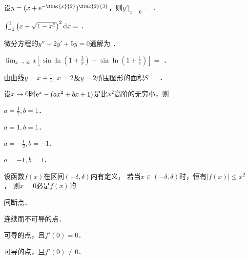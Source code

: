 \documentclass[plain,noanswer,medmath]{../../template/jnuexam}
\begin{document}




\begin{problem}
设$y = (x + \e^{-\frac{x}{2}})^{\frac{2}{3}}$，则$y'|_{x = 0} =$ \fillin{}．
\end{problem}


\begin{problem}
$\int_{-1}^1\left(x + \sqrt{1 - x^2} \right)^2 \mathop{}\!\mathrm{d} x =$ \fillin{}．
\end{problem}


\begin{problem}
微分方程的$y'' + 2y' + 5y = 0$通解为 \fillin{}．
\end{problem}


\begin{problem}
$\lim_{x \to \infty} x\left[\sin \ln \left(1 + \frac{3}{x} \right)
  - \sin \ln \left(1 + \frac{1}{x} \right) \right] =$ \fillin{}．
\end{problem}


\begin{problem}
由曲线$y = x + \frac{1}{x}$, $x = 2$及$y = 2$所围图形的面积$S=$ \fillin{}．
\end{problem}




\begin{problem}
设$x \to 0$时$\mathrm{e}^x - (ax^2 + bx + 1)$是比$x^2$高阶的无穷小，则\pickout{}
\begin{abcd}
\item $a = \frac{1}{2},b = 1$．		
\item $a = 1,b = 1$．
\item $a = - \frac{1}{2},b = - 1$．		
\item $a = - 1,b = 1$．
\end{abcd}
\end{problem}


\begin{problem}
设函数$f(x)$在区间$(- \delta ,\delta)$内有定义，
若当$x \in(- \delta ,\delta)$时，恒有$\left| f(x) \right| \le x^2$，
则$x = 0$必是$f(x)$的\pickout{}
\begin{abcd}
\item 间断点． 							
\item 连续而不可导的点．
\item 可导的点，且$f'(0) = 0$．			
\item 可导的点，且$f'(0) \ne 0$．
\end{abcd}
\end{problem}
\end{document}
